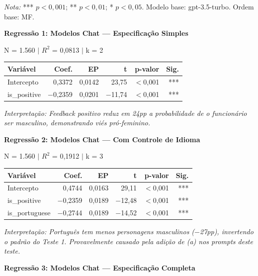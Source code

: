 \documentclass[12pt,a4paper]{article}
\begin{document}
\textit{Nota:} *** $p < 0,001$; ** $p < 0,01$; * $p < 0,05$. Modelo base:
gpt-3.5-turbo. Ordem base: MF.

\vspace{0.5cm}
\noindent\textbf{Regressão 1: Modelos Chat --- Especificação Simples}

\noindent N = 1.560 $|$ $R^2$ = 0,0813 $|$ k = 2

\begin{table}[H]
\centering
\begin{tabular}{lrrrrr}
\toprule
\textbf{Variável} & \textbf{Coef.} & \textbf{EP} & \textbf{t} & \textbf{p-valor} & \textbf{Sig.} \\
\midrule
Intercepto & 0,3372 & 0,0142 & 23,75 & $<$0,001 & *** \\
is\_positive & $-$0,2359 & 0,0201 & $-$11,74 & $<$0,001 & *** \\
\bottomrule
\end{tabular}
\end{table}

\noindent\textit{Interpretação: Feedback positivo reduz em 24pp a probabilidade de o
funcionário ser masculino, demonstrando viés pró-feminino.}

\vspace{0.5cm}
\noindent\textbf{Regressão 2: Modelos Chat --- Com Controle de Idioma}

\noindent N = 1.560 $|$ $R^2$ = 0,1912 $|$ k = 3

\begin{table}[H]
\centering
\begin{tabular}{lrrrrr}
\toprule
\textbf{Variável} & \textbf{Coef.} & \textbf{EP} & \textbf{t} & \textbf{p-valor} & \textbf{Sig.} \\
\midrule
Intercepto & 0,4744 & 0,0163 & 29,11 & $<$0,001 & *** \\
is\_positive & $-$0,2359 & 0,0189 & $-$12,48 & $<$0,001 & *** \\
is\_portuguese & $-$0,2744 & 0,0189 & $-$14,52 & $<$0,001 & *** \\
\bottomrule
\end{tabular}
\end{table}

\noindent\textit{Interpretação: Português tem menos personagens masculinos ($-$27pp),
invertendo o padrão do Teste 1. Provavelmente causado pela adição de (a)
nos prompts deste teste.}

\vspace{0.5cm}
\noindent\textbf{Regressão 3: Modelos Chat --- Especificação Completa}
\end{document}
